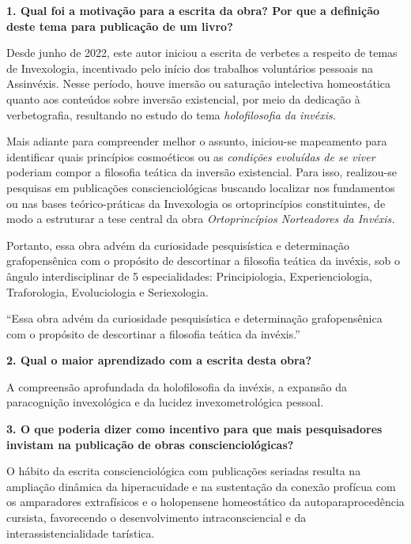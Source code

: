 \documentclass{gescons}
\begin{document}
    \begin{multicols}{2}



\textbf{1. Qual foi a motivação para a escrita da obra? Por que a definição deste tema para publicação de um livro?}

Desde junho de 2022, este autor iniciou a escrita de verbetes a respeito de temas de Invexologia, incentivado pelo início dos trabalhos voluntários pessoais na Assinvéxis. Nesse período, houve imersão ou saturação intelectiva homeostática quanto aos conteúdos sobre inversão existencial, por meio da dedicação à verbetografia, resultando no estudo do tema \textit{holofilosofia da invéxis.}

Mais adiante para compreender melhor o assunto, iniciou-se mapeamento para identificar quais princípios cosmoéticos ou as \textit{condições evoluídas de se viver} poderiam compor a filosofia teática da inversão existencial. Para isso, realizou-se pesquisas em publicações conscienciológicas buscando localizar nos fundamentos ou nas bases teórico-práticas da Invexologia os ortoprincípios constituintes, de modo a estruturar a tese central da obra \textit{Ortoprincípios Norteadores da Invéxis.}

Portanto, essa obra advém da curiosidade pesquisística e determinação grafopensênica com o propósito de descortinar a filosofia teática da invéxis, sob 
o ângulo interdisciplinar de 5 especialidades: Principiologia, Experienciologia, Traforologia, Evoluciologia e Seriexologia.

\begin{pullquote}
``Essa obra advém da curiosidade pesquisística e determinação grafopensênica com o propósito de descortinar a filosofia teática da invéxis.''    
\end{pullquote}




\textbf{2. Qual o maior aprendizado com a escrita desta obra?}

A compreensão aprofundada da holofilosofia da invéxis, a expansão da paracognição invexológica e da lucidez invexometrológica pessoal.

\textbf{3. O que poderia dizer como incentivo para que mais pesquisadores invistam na publicação de obras conscienciológicas?}

O hábito da escrita conscienciológica com publicações seriadas resulta na ampliação dinâmica da hiperacuidade e na sustentação da conexão profícua com os amparadores extrafísicos e o holopensene homeostático da autoparaprocedência cursista, favorecendo o desenvolvimento intraconsciencial e da interassistencialidade tarística.


    
    
    \end{multicols}
\end{document}
